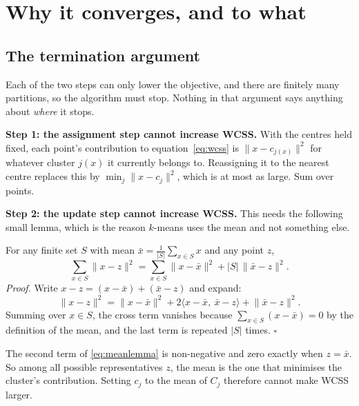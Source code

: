 \documentclass[11pt]{article}
\begin{document}
\section{Why it converges, and to what}
\label{sec:conv}

\subsection{The termination argument}

\begin{keyidea}
Each of the two steps can only lower the objective, and there are finitely
many partitions, so the algorithm must stop. Nothing in that argument says
anything about \emph{where} it stops.
\end{keyidea}

\textbf{Step 1: the assignment step cannot increase WCSS.} With the centres
held fixed, each point's contribution to equation~\eqref{eq:wcss} is
$\lVert x - c_{j(x)}\rVert^2$ for whatever cluster $j(x)$ it currently belongs
to. Reassigning it to the nearest centre replaces this by
$\min_j \lVert x - c_j\rVert^2$, which is at most as large. Sum over points.

\textbf{Step 2: the update step cannot increase WCSS.} This needs the
following small lemma, which is the reason $k$-means uses the mean and not
something else.

\begin{worked}
For any finite set $S$ with mean $\bar{x} = \frac{1}{|S|}\sum_{x \in S} x$ and
any point $z$,
\begin{equation}
  \sum_{x \in S}\lVert x - z\rVert^2
  = \sum_{x \in S}\lVert x - \bar{x}\rVert^2 + |S|\,\lVert \bar{x} - z\rVert^2 .
  \label{eq:meanlemma}
\end{equation}
\emph{Proof.} Write $x - z = (x - \bar{x}) + (\bar{x} - z)$ and expand:
\[
  \lVert x - z\rVert^2 = \lVert x - \bar{x}\rVert^2
    + 2\langle x - \bar{x},\ \bar{x} - z\rangle
    + \lVert \bar{x} - z\rVert^2 .
\]
Summing over $x \in S$, the cross term vanishes because
$\sum_{x \in S}(x - \bar{x}) = 0$ by the definition of the mean, and the last
term is repeated $|S|$ times. \ensuremath{\square}

The second term of \eqref{eq:meanlemma} is non-negative and zero exactly when
$z = \bar{x}$. So among all possible representatives $z$, the mean is the one
that minimises the cluster's contribution. Setting $c_j$ to the mean of $C_j$
therefore cannot make WCSS larger.
\end{worked}
\end{document}
